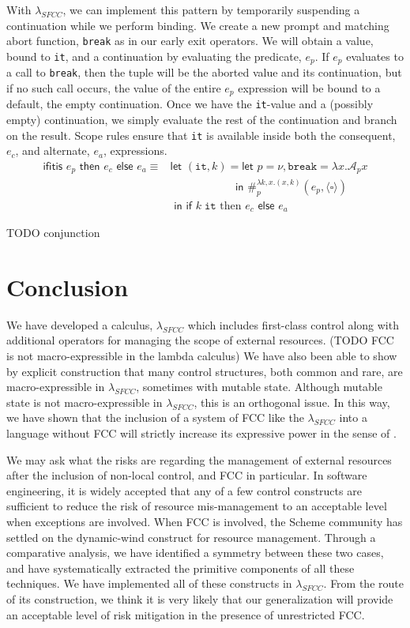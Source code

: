 \documentclass[11pt]{article}
\newcommand{\maybePage}{\newpage}
\newcommand\x{\lambda x}
\newcommand{\letin}[2]{\textsf{let }#1\textsf{ in }#2}
\newcommand\A{\mathcal{A}}
\newcommand{\angles}[1]{\langle#1\rangle}
\begin{document}
With $\lambda_{SFCC}$, we can implement this pattern by temporarily suspending a continuation while we perform binding.
We create a new prompt and matching abort function, \texttt{break} as in our early exit operators.
We will obtain a value, bound to \texttt{it}, and a continuation by evaluating the predicate, $e_p$.
If $e_p$ evaluates to a call to \texttt{break}, then the tuple will be the aborted value and its continuation, but if no such call occurs, the value of the entire $e_p$ expression will be bound to a default, the empty continuation.
Once we have the \texttt{it}-value and a (possibly empty) continuation, we simply evaluate the rest of the continuation and branch on the result.
Scope rules ensure that \texttt{it} is available inside both the consequent, $e_c$, and alternate, $e_a$, expressions.
\begin{align*}
\textsf{ifitis }e_p\textsf{ then }e_c\textsf{ else }e_a \equiv{}
	&\letin{(\texttt{it}, k) = \letin{p = \nu, \texttt{break} = \x.\A_px
	\\&\qquad\qquad\quad\;\;}{\#_p^{\lambda k,x.(x,k)}(e_p, \angles{\square})}
	\\&}{\textsf{if }k\;\texttt{it}\text{ then }e_c\textsf{ else }e_a}
\end{align*}

TODO conjunction


\maybePage
\section{Conclusion}

We have developed a calculus, $\lambda_{SFCC}$ which includes first-class control along with additional operators for managing the scope of external resources.
(TODO FCC is not macro-expressible in the lambda calculus)
We have also been able to show by explicit construction that many control structures, both common and rare, are macro-expressible in $\lambda_{SFCC}$, sometimes with mutable state.
Although mutable state is not macro-expressible in $\lambda_{SFCC}$, this is an orthogonal issue.
In this way, we have shown that the inclusion of a system of FCC like the $\lambda_{SFCC}$ into a language without FCC will strictly increase its expressive power in the sense of \cite{Felleisen90expressive}.

We may ask what the risks are regarding the management of external resources after the inclusion of non-local control, and FCC in particular.
In software engineering, it is widely accepted that any of a few control constructs are sufficient to reduce the risk of resource mis-management to an acceptable level when exceptions are involved.
When FCC is involved, the Scheme community has settled on the dynamic-wind construct for resource management.
Through a comparative analysis, we have identified a symmetry between  these two cases, and have systematically extracted the primitive components of all these techniques.
We have implemented all of these constructs in $\lambda_{SFCC}$.
From the route of its construction, we think it is very likely that our generalization will provide an acceptable level of risk mitigation in the presence of unrestricted FCC.
\end{document}

